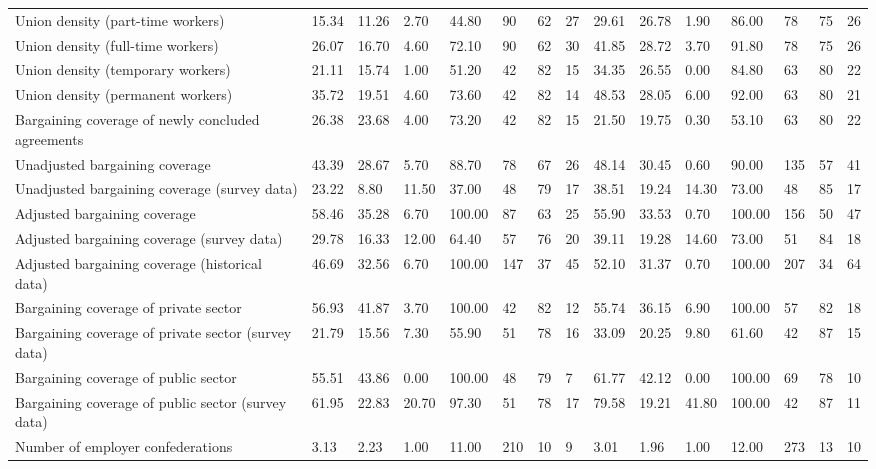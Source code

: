 \begin{longtable}{lllllllllllllll}
Union density (part-time workers) & 15.34 & 11.26 & 2.70 & 44.80 & 90 & 62 & 27 & 29.61 & 26.78 & 1.90 & 86.00 & 78 & 75 & 26\\
Union density (full-time workers) & 26.07 & 16.70 & 4.60 & 72.10 & 90 & 62 & 30 & 41.85 & 28.72 & 3.70 & 91.80 & 78 & 75 & 26\\
Union density (temporary workers) & 21.11 & 15.74 & 1.00 & 51.20 & 42 & 82 & 15 & 34.35 & 26.55 & 0.00 & 84.80 & 63 & 80 & 22\\
Union density (permanent workers) & 35.72 & 19.51 & 4.60 & 73.60 & 42 & 82 & 14 & 48.53 & 28.05 & 6.00 & 92.00 & 63 & 80 & 21\\
\addlinespace
Bargaining coverage of newly concluded agreements & 26.38 & 23.68 & 4.00 & 73.20 & 42 & 82 & 15 & 21.50 & 19.75 & 0.30 & 53.10 & 63 & 80 & 22\\
Unadjusted bargaining coverage & 43.39 & 28.67 & 5.70 & 88.70 & 78 & 67 & 26 & 48.14 & 30.45 & 0.60 & 90.00 & 135 & 57 & 41\\
Unadjusted bargaining coverage (survey data) & 23.22 & 8.80 & 11.50 & 37.00 & 48 & 79 & 17 & 38.51 & 19.24 & 14.30 & 73.00 & 48 & 85 & 17\\
Adjusted bargaining coverage & 58.46 & 35.28 & 6.70 & 100.00 & 87 & 63 & 25 & 55.90 & 33.53 & 0.70 & 100.00 & 156 & 50 & 47\\
Adjusted bargaining coverage (survey data) & 29.78 & 16.33 & 12.00 & 64.40 & 57 & 76 & 20 & 39.11 & 19.28 & 14.60 & 73.00 & 51 & 84 & 18\\
\addlinespace
Adjusted bargaining coverage (historical data) & 46.69 & 32.56 & 6.70 & 100.00 & 147 & 37 & 45 & 52.10 & 31.37 & 0.70 & 100.00 & 207 & 34 & 64\\
Bargaining coverage of private sector & 56.93 & 41.87 & 3.70 & 100.00 & 42 & 82 & 12 & 55.74 & 36.15 & 6.90 & 100.00 & 57 & 82 & 18\\
Bargaining coverage of private sector (survey data) & 21.79 & 15.56 & 7.30 & 55.90 & 51 & 78 & 16 & 33.09 & 20.25 & 9.80 & 61.60 & 42 & 87 & 15\\
Bargaining coverage of public sector & 55.51 & 43.86 & 0.00 & 100.00 & 48 & 79 & 7 & 61.77 & 42.12 & 0.00 & 100.00 & 69 & 78 & 10\\
Bargaining coverage of public sector (survey data) & 61.95 & 22.83 & 20.70 & 97.30 & 51 & 78 & 17 & 79.58 & 19.21 & 41.80 & 100.00 & 42 & 87 & 11\\
\addlinespace
Number of employer confederations & 3.13 & 2.23 & 1.00 & 11.00 & 210 & 10 & 9 & 3.01 & 1.96 & 1.00 & 12.00 & 273 & 13 & 10\\

\end{longtable}
